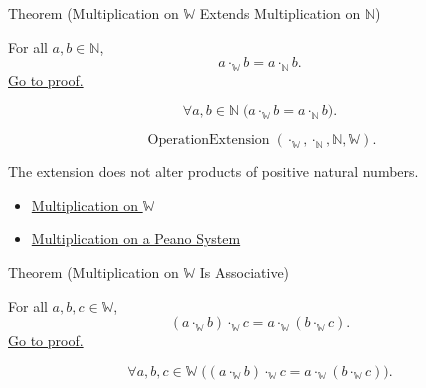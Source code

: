 \begin{theorembox}{Theorem (Multiplication on \texorpdfstring{$\mathbb{W}$}{W} Extends Multiplication on \texorpdfstring{$\mathbb{N}$}{N})}
\begin{theorem}
\label{thm:multiplication-on-w-extends-multiplication-on-n}
For all $a,b\in\mathbb{N}$,
\[
a\cdot_{\mathbb{W}}b=a\cdot_{\mathbb{N}}b.
\]
\hyperref[prf:multiplication-on-w-extends-multiplication-on-n]{Go to proof.}
\end{theorem}
\end{theorembox}

\begin{remark*}
\[
\forall a,b\in\mathbb{N}\;
\bigl(a\cdot_{\mathbb{W}}b=a\cdot_{\mathbb{N}}b\bigr).
\]
\end{remark*}

\begin{remark*}
\[
\operatorname{OperationExtension}
(\cdot_{\mathbb{W}},\cdot_{\mathbb{N}},\mathbb{N},\mathbb{W}).
\]
\end{remark*}

\begin{remark*}[Interpretation]
The extension does not alter products of positive natural numbers.
\end{remark*}

\begin{dependencies}
\begin{itemize}
  \item \hyperref[def:multiplication-on-w]{Multiplication on $\mathbb{W}$}
  \item \hyperref[def:multiplication-on-peano-system]{Multiplication on a Peano System}
\end{itemize}
\end{dependencies}

\begin{theorembox}{Theorem (Multiplication on \texorpdfstring{$\mathbb{W}$}{W} Is Associative)}
\begin{theorem}
\label{thm:multiplication-on-w-associative}
For all $a,b,c\in\mathbb{W}$,
\[
(a\cdot_{\mathbb{W}}b)\cdot_{\mathbb{W}}c
=
a\cdot_{\mathbb{W}}(b\cdot_{\mathbb{W}}c).
\]
\hyperref[prf:multiplication-on-w-associative]{Go to proof.}
\end{theorem}
\end{theorembox}

\begin{remark*}
\[
\forall a,b,c\in\mathbb{W}\;
\bigl((a\cdot_{\mathbb{W}}b)\cdot_{\mathbb{W}}c
=a\cdot_{\mathbb{W}}(b\cdot_{\mathbb{W}}c)\bigr).
\]
\end{remark*}

